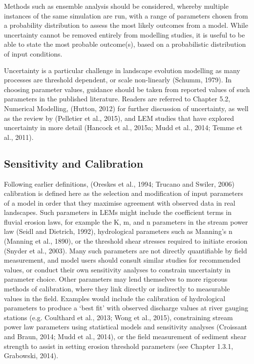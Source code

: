 Methods such as ensemble analysis should be considered, whereby multiple instances of the same simulation are run, with a range of parameters chosen from a probability distribution to assess the most likely outcomes from a model. While uncertainty cannot be removed entirely from modelling studies, it is useful to be able to state the most probable outcome(s), based on a probabilistic distribution of input conditions.

Uncertainty is a particular challenge in landscape evolution modelling as many processes are threshold dependent, or scale non-linearly (Schumm, 1979). In choosing parameter values, guidance should be taken from reported values of such parameters in the published literature. Readers are referred to Chapter 5.2, Numerical Modelling, (Hutton, 2012) for further discussion of uncertainty, as well as the review by (Pelletier et al., 2015), and LEM studies that have explored uncertainty in more detail (Hancock et al., 2015a; Mudd et al., 2014; Temme et al., 2011).

\subsection{Sensitivity and Calibration}
Following earlier definitions, (Oreskes et al., 1994; Trucano and Swiler, 2006) calibration is defined here as the selection and modification of input parameters of a model in order that they maximise agreement with observed data in real landscapes. Such parameters in LEMs might include the coefficient terms in fluvial erosion laws, for example the K, m, and n parameters in the stream power law (Seidl and Dietrich, 1992), hydrological parameters such as Manning’s n (Manning et al., 1890), or the threshold shear stresses required to initiate erosion (Snyder et al., 2003). Many such parameters are not directly quantifiable by field measurement, and model users should consult similar studies for recommended values, or conduct their own sensitivity analyses to constrain uncertainty in parameter choice. Other parameters may lend themselves to more rigorous methods of calibration, where they link directly or indirectly to measurable values in the field. Examples would include the calibration of hydrological parameters to produce a ‘best fit’ with observed discharge values at river gauging stations (e.g. Coulthard et al., 2013; Wong et al., 2015), constraining stream power law parameters using statistical models and sensitivity analyses (Croissant and Braun, 2014; Mudd et al., 2014), or the field measurement of sediment shear strength to assist in setting erosion threshold parameters (see Chapter 1.3.1, Grabowski, 2014).


